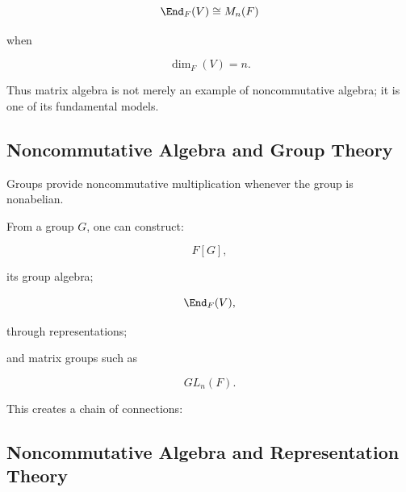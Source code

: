 \[ \End_F(V)\cong M_n(F) \]

when

\[ \dim_F(V)=n. \]

Thus matrix algebra is not merely an example of noncommutative algebra; it is
one of its fundamental models.

\subsection{Noncommutative Algebra and Group Theory}
\label{subsec:noncommutative-group-theory}

Groups provide noncommutative multiplication whenever the group is
nonabelian.

From a group \(G\), one can construct:

\[ F[G], \]

its group algebra;

\[ \End_F(V), \]

through representations;

and matrix groups such as

\[ GL_n(F). \]

This creates a chain of connections:

\begin{center}
\end{center}

\subsection{Noncommutative Algebra and Representation Theory}
\label{subsec:noncommutative-representation-connection}

